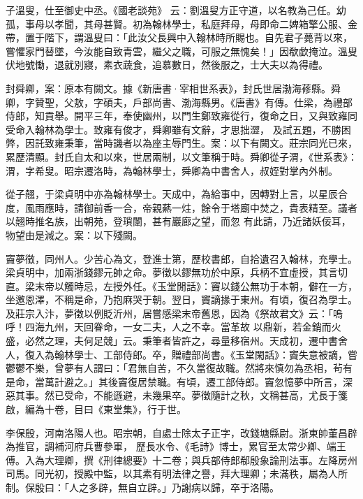 \begin{pinyinscope}
 子溫叟，仕至御史中丞。《國老談苑》
 云：劉溫叟方正守道，以名教為己任。幼孤，事母以孝聞，其母甚賢。初為翰林學士，私庭拜母，母即命二婢箱擎公服、金帶，置于階下，謂溫叟曰：「此汝父長興中入翰林時所賜也。自先君子薨背以來，嘗懼家門替墜，今汝能自致青雲，繼父之職，可服之無愧矣！」因欷歔掩泣。溫叟伏地號慟，退就別寢，素衣蔬食，追慕數日，然後服之，士大夫以為得禮。



 封舜卿，案：原本有闕文。據《新唐書·宰相世系表》，封氏世居渤海蓚縣。舜卿，字贊聖，父敖，字碩夫，戶部尚書、渤海縣男。《唐書》有傳。仕梁，為禮部侍郎，知貢舉。開平三年，奉使幽州，以門生鄭致雍從行，復命之日，又與致雍同受命入翰林為學士。致雍有俊才，舜卿雖有文辭，才思拙澀，
 及試五題，不勝困弊，因託致雍秉筆，當時譏者以為座主辱門生。案：以下有闕文。莊宗同光已來，累歷清顯。封氏自太和以來，世居兩制，以文筆稱于時。舜卿從子渭，《世系表》：渭，字希叟。昭宗遷洛時，為翰林學士，舜卿為中書舍人，叔姪對掌內外制。



 從子翹，于梁貞明中亦為翰林學士。天成中，為給事中，因轉對上言，以星辰合度，風雨應時，請御前香一合，帝親爇一炷，餘令于塔廟中焚之，貴表精至。議者以翹時推名族，出朝苑，登瑣闈，甚有巖廊之望，而忽
 有此請，乃近諸妖佞耳，物望由是減之。案：以下殘闕。



 竇夢徵，同州人。少苦心為文，登進士第，歷校書郎，自拾遺召入翰林，充學士。梁貞明中，加兩浙錢鏐元帥之命。夢徵以鏐無功於中原，兵柄不宜虛授，其言切直。梁末帝以觸時忌，左授外任。《玉堂閒話》：竇以錢公無功于本朝，僻在一方，坐邀恩澤，不稱是命，乃抱麻哭于朝。翌日，竇謫掾于東州。有頃，復召為學士。及莊宗入汴，夢徵以例貶沂州，居嘗感梁末帝舊恩，因為《祭故君文》云：「嗚呼！四海九州，天回眷命，一女二夫，人之不幸。當革故
 以鼎新，若金銷而火盛，必然之理，夫何足競」云。秉筆者皆許之，尋量移宿州。天成初，遷中書舍人，復入為翰林學士、工部侍郎。卒，贈禮部尚書。《玉堂閑話》：竇失意被謫，嘗鬱鬱不樂，曾夢有人謂曰：「君無自苦，不久當復故職。然將來慎勿為丞相，茍有是命，當萬計避之。」其後竇復居禁職。有頃，遷工部侍郎。竇忽憶夢中所言，深惡其事。然已受命，不能遜避，未幾果卒。夢徵隨計之秋，文稱甚高，尤長于箋啟，編為十卷，目曰《東堂集》，行于世。



 李保殷，河南洛陽人也。昭宗朝，自處士除太子正字，改錢塘縣尉。浙東帥董昌辟為推官，調補河府兵曹參軍，
 歷長水令、《毛詩》博士，累官至太常少卿、端王傅。入為大理卿，撰《刑律總要》十二卷；與兵部侍郎郗殷象論刑法事。左降房州司馬。同光初，授殿中監，以其素有明法律之譽，拜大理卿；未滿秩，屬為人所制。保殷曰：「人之多辟，無自立辟。」乃謝病以歸，卒于洛陽。




\end{pinyinscope}
